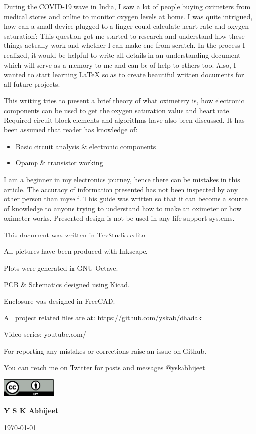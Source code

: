 During the COVID-19 wave in India, I saw a lot of people buying oximeters from medical stores and online to monitor oxygen levels at home. I was quite intrigued, how can a small device plugged to a finger could calculate heart rate and oxygen saturation? This question got me started to research and understand how these things actually work and whether I can make one from scratch. In the process I realized, it would be helpful to write all details in an understanding document which will serve as a memory to me and can be of help to others too.
Also, I wanted to start learning \LaTeX \hspace{1pt} so as to create beautiful written documents for all future projects.\medskip

This writing tries to present a brief theory of what oximetery is, how electronic components can be used to get the oxygen saturation value and heart rate. Required circuit block elements and algorithms have also been discussed. It has been assumed that reader has knowledge of:

\begin{itemize}
	\item Basic circuit analysis \& electronic components
	\item Opamp \& transistor working
\end{itemize}

\bigskip

I am a beginner in my electronics journey, hence there can be mistakes in this article. The accuracy of information presented has not been inspected by any other person than myself.
This guide was written so that it can become a source of knowledge to anyone trying to understand how to make an oximeter or how oximeter works. Presented design is not be used in any life support systems.

\bigskip
This document was written in TexStudio editor.

All pictures have been produced with Inkscape.

Plots were generated in GNU Octave.

PCB \& Schematics designed using Kicad.

Enclosure was designed in FreeCAD.

\medskip
All project related files are at: \url{https://github.com/yskab/dhadak}

Video series: youtube.com/

For reporting any mistakes or corrections raise an issue on Github.

You can reach me on Twitter for posts and messages \href{https://twitter.com/yskabhijeet}{@yskabhijeet}

\includegraphics[width=0.2\textwidth]{../common/cc.png}\par

\vfill
\hfill
{\Large\bfseries Y S K Abhijeet}\par
\hfill
\large \today

